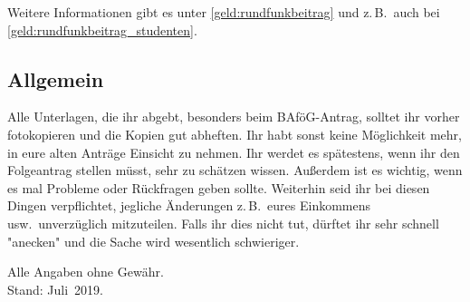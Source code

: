 \begin{multicols*}{2}
Weitere Informationen gibt es unter \cref{geld:rundfunkbeitrag} und z.\,B.\ auch bei \cref{geld:rundfunkbeitrag_studenten}.

\vspace{-2ex}

\subsection{Allgemein}
Alle Unterlagen, die ihr abgebt, besonders beim BAföG-Antrag, solltet ihr vorher fotokopieren und die Kopien gut abheften.
Ihr habt sonst keine Möglichkeit mehr, in eure alten Anträge Einsicht zu nehmen.
Ihr werdet es spätestens, wenn ihr den Folgeantrag stellen müsst, sehr zu schätzen wissen.
Außerdem ist es wichtig, wenn es mal Probleme oder Rückfragen geben sollte.
Weiterhin seid ihr bei diesen Dingen verpflichtet, jegliche Änderungen z.\,B.\ eures Einkommens usw.\ unverzüglich mitzuteilen.
Falls ihr dies nicht tut, dürftet ihr sehr schnell "anecken" und die Sache wird wesentlich schwieriger.

\begin{flushright}
	Alle Angaben ohne Gewähr.\\
	Stand: Juli~2019.
\end{flushright}

\vspace{-2ex}


\end{multicols*}
